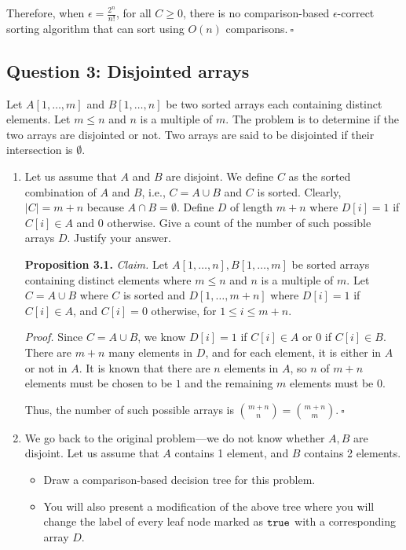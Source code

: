 \begin{enumerate}[resume]
\begin{solution}
Therefore, when $\epsilon=\frac{2^n}{n!}$, for all $C\geq 0$, there is no comparison-based $\epsilon$-correct sorting algorithm that can sort using $O(n)$ comparisons.$~\square$
\end{solution}
\end{enumerate}
\newpage
\subsection*{Question 3: Disjointed arrays}
Let $A[1,\ldots,m]$ and $B[1,\ldots,n]$ be two sorted
arrays each containing distinct elements. Let
$m\leq n$ and $n$ is a multiple of $m$. 
The problem is to determine if the two arrays
are disjointed or not. Two arrays are said
to be disjointed if their intersection is
$\emptyset$. 

\begin{enumerate}
	\item Let us assume that $A$ and $B$ are disjoint.
	We define $C$ as the sorted combination of
	$A$ and $B$, i.e., $C=A\cup B$ and $C$ is sorted. Clearly,
	$|C|=m+n$ because $A\cap B=\emptyset$. Define
	$D$ of length $m+n$ where $D[i]=1$ if $C[i]\in A$ and 0
	otherwise. Give a count of the number of such possible
	arrays $D$. Justify your answer. 

\begin{solution}
\textbf{Proposition 3.1.}
\textit{Claim. }Let $A[1,\dots,n],B[1,\dots,m]$ be sorted arrays containing distinct elements where $m\leq n$ and $n$ is a multiple of $m$. Let $C=A\cup B$ where $C$ is sorted and $D[1,\dots,m+n]$ where $D[i]=1$ if $C[i]\in A$, and $C[i]=0$ otherwise, for $1\leq i\leq m+n$.

\textit{Proof. }Since $C=A\cup B$, we know $D[i]=1$ if $C[i]\in A$ or $0$ if $C[i]\in B$. There are $m+n$ many elements in $D$, and for each element, it is either in $A$ or not in $A$. It is known that there are $n$ elements in $A$, so $n$ of $m+n$ elements must be chosen to be $1$ and the remaining $m$ elements must be $0$.

Thus, the number of such possible arrays is $\binom{m+n}{n}=\binom{m+n}{m}$.$~\square$
\end{solution}
\newpage
\item We go back to the original problem---we do not know whether $A,B$ are disjoint. Let us assume that $A$ contains 1 element, and $B$ contains 2 elements. 

\begin{itemize}
\item Draw a comparison-based decision tree for this problem.
\item You will also present a modification of the above tree
where you will change the label of every leaf node marked as $\mathtt{true}$ 
with a corresponding array $D$. 
\end{itemize}


\end{enumerate}
